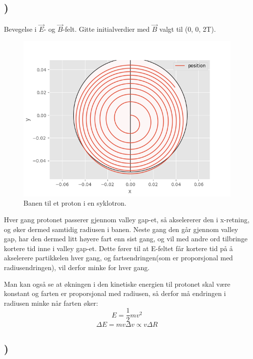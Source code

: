 \documentclass[report,12pt,norsk]{article}
\begin{document}
\newpage

\section{}
\subsection{)}

Bevegelse i $\vec{E}$- og $\vec{B}$-felt.
Gitte initialverdier med $\vec{B}$ valgt til (0, 0, 2T).

\begin{figure}[h!]
        \centering 
        \includegraphics[scale=0.7]{cyclotron_1.png}
        \caption{Banen til et proton i en syklotron.}
\end{figure}

\newpage

Hver gang protonet passerer gjennom valley gap-et, så akselererer den i x-retning, og øker dermed samtidig radiusen i banen. Neste gang den går gjennom valley gap, har den dermed litt høyere fart enn sist gang, og vil med andre ord tilbringe kortere tid inne i valley gap-et. Dette fører til at E-feltet får kortere tid på å akselerere partikkelen hver gang, og fartsendringen(som er proporsjonal med radiusendringen), vil derfor minke for hver gang.

Man kan også se at økningen i den kinetiske energien til protonet skal være konstant og farten er proporsjonal med radiusen, så derfor må endringen i radiusen minke når farten øker:
\[E = \frac{1}{2}mv^{2}\]
\[\Delta E = mv\Delta v \propto v\Delta R\]
\newpage
\subsection{)}
\end{document}
